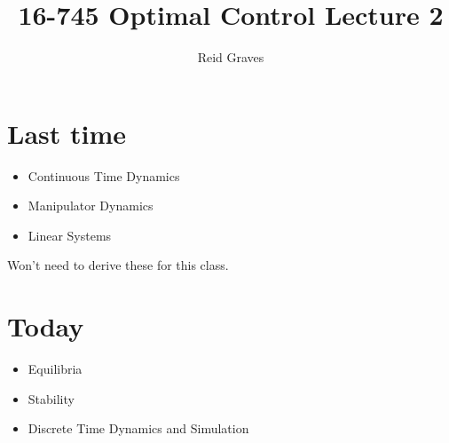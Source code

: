 \documentclass[11pt]{article}
\title{16-745 Optimal Control Lecture 2}
\author{Reid Graves}
\begin{document}
\maketitle

\section{Last time}
\begin{itemize}
    \item Continuous Time Dynamics
    \item Manipulator Dynamics
    \item Linear Systems
\end{itemize}
Won't need to derive these for this class.

\section{Today}
\begin{itemize}
    \item Equilibria
    \item Stability
    \item Discrete Time Dynamics and Simulation
\end{itemize}
\end{document}
